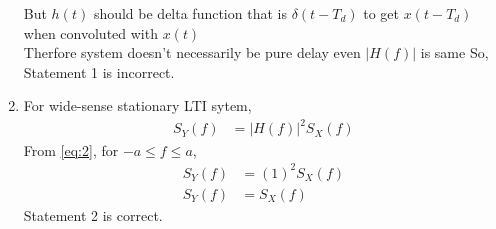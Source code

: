 \documentclass[journal,12pt,twocolumn]{IEEEtran}
\theoremstyle{remark}
\begin{document}
\begin{enumerate}
But $h(t)$ should be delta function that is $\delta(t-T_d)$ to get $x(t-T_d)$ when convoluted with $x(t)$\\
 Therfore system doesn't necessarily be pure delay even $|H(f)|$ is same 
So, Statement 1 is incorrect.
\item For wide-sense stationary LTI sytem,
\begin{align}
S_Y(f)&=|H(f)|^2S_X(f)
\end{align}
From \eqref{eq:2}, for $-a \leq f \leq a$,
\begin{align}
S_Y(f)&=(1)^2S_X(f)\\
S_Y(f)&=S_X(f)
\end{align}
Statement 2 is correct.
\end{enumerate}
\end{document}
